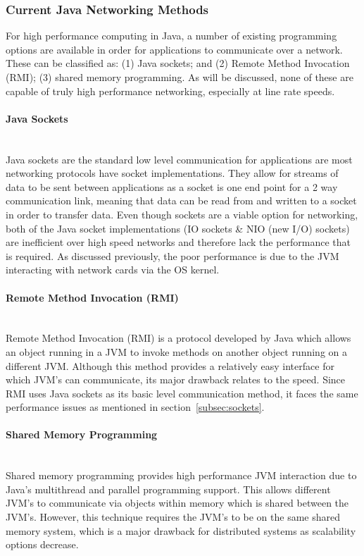 \documentclass[interim_report.tex]{subfiles}
\begin{document}
\subsubsection{Current Java Networking Methods}
For high performance computing in Java, a number of existing programming options are available in order for applications to communicate over a network. These can be classified as: (1) Java sockets; and (2) Remote Method Invocation (RMI); (3) shared memory programming. As will be discussed, none of these are capable of truly high performance networking, especially at line rate speeds.

\paragraph{Java Sockets}\mbox{}\\ %
\label{subsec:sockets}
Java sockets are the standard low level communication for applications are most networking protocols have socket implementations. They allow for streams of data to be sent between applications as a socket is one end point for a 2 way communication link, meaning that data can be read from and written to a socket in order to transfer data. Even though sockets are a viable option for networking, both of the Java socket implementations (IO sockets \& NIO (new I/O) sockets) are inefficient over high speed networks \cite{sockets} and therefore lack the performance that is required. As discussed previously, the poor performance is due to the JVM interacting with network cards via the OS kernel.

\paragraph{Remote Method Invocation (RMI)}\mbox{}\\ %
Remote Method Invocation (RMI) is a protocol developed by Java which allows an object running in a JVM to invoke methods on another object running on a different JVM. Although this method provides a relatively easy interface for which JVM's can communicate, its major drawback relates to the speed. Since RMI uses Java sockets as its basic level communication method, it faces the same performance issues as mentioned in section~\ref{subsec:sockets}.

\paragraph{Shared Memory Programming}\mbox{}\\ %
Shared memory programming provides high performance JVM interaction due to Java's multithread and parallel programming support. This allows different JVM's to communicate via objects within memory which is shared between the JVM's. However, this technique requires the JVM's to be on the same shared memory system, which is a major drawback for distributed systems as scalability options decrease. \\
\end{document}
